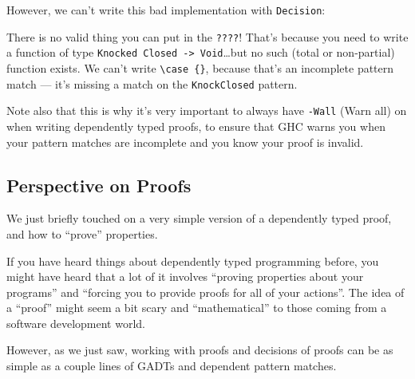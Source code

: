 \documentclass[]{article}
\newenvironment{Shaded}{}{}
\newcommand{\CommentTok}[1]{\textcolor[rgb]{0.38,0.63,0.69}{\textit{#1}}}
\newcommand{\DataTypeTok}[1]{\textcolor[rgb]{0.56,0.13,0.00}{#1}}
\newcommand{\FunctionTok}[1]{\textcolor[rgb]{0.02,0.16,0.49}{#1}}
\newcommand{\KeywordTok}[1]{\textcolor[rgb]{0.00,0.44,0.13}{\textbf{#1}}}
\newcommand{\NormalTok}[1]{#1}
\newcommand{\OtherTok}[1]{\textcolor[rgb]{0.00,0.44,0.13}{#1}}
\begin{document}
However, we can't write this bad implementation with \texttt{Decision}:

\begin{Shaded}
\end{Shaded}

There is no valid thing you can put in the \texttt{????}! That's because you
need to write a function of type
\texttt{Knocked\ \textquotesingle{}Closed\ -\textgreater{}\ Void}\ldots{}but no
such (total or non-partial) function exists. We can't write
\texttt{\textbackslash{}case\ \{\}}, because that's an incomplete pattern match
--- it's missing a match on the \texttt{KnockClosed} pattern.

Note also that this is why it's very important to always have \texttt{-Wall}
(Warn all) on when writing dependently typed proofs, to ensure that GHC warns
you when your pattern matches are incomplete and you know your proof is invalid.

\hypertarget{perspective-on-proofs}{%
\subsection{Perspective on Proofs}\label{perspective-on-proofs}}

We just briefly touched on a very simple version of a dependently typed proof,
and how to ``prove'' properties.

If you have heard things about dependently typed programming before, you might
have heard that a lot of it involves ``proving properties about your programs''
and ``forcing you to provide proofs for all of your actions''. The idea of a
``proof'' might seem a bit scary and ``mathematical'' to those coming from a
software development world.

However, as we just saw, working with proofs and decisions of proofs can be as
simple as a couple lines of GADTs and dependent pattern matches.
\end{document}
